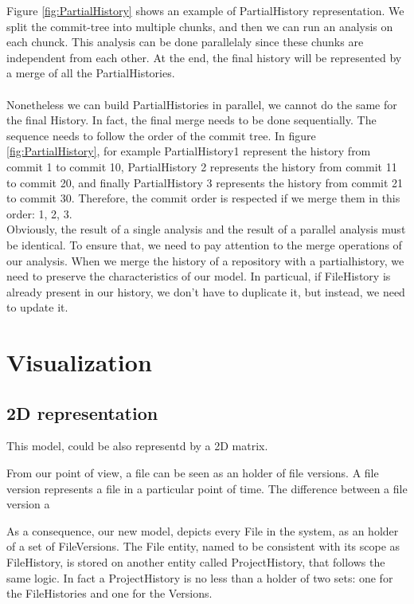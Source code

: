 Figure \ref{fig:PartialHistory} shows an example of PartialHistory representation. 
We split the commit-tree into multiple chunks, and then we can run an analysis on each chunck. 
This analysis can be done parallelaly since these chunks are independent from each other. 
At the end, the final history will be represented by a merge of all the PartialHistories. \\
\\
Nonetheless we can build PartialHistories in parallel, we cannot do the same for the final History. 
In fact, the final merge needs to be done sequentially. The sequence needs to follow the order of the commit tree. 
In figure \ref{fig:PartialHistory}, for example
PartialHistory1 represent the history from commit 1 to commit 10, 
PartialHistory 2 represents the history from commit 11 to commit 20, and finally 
PartialHistory 3 represents the history from commit 21 to commit 30.
Therefore, the commit order is respected if we merge them in this order: 1, 2, 3. 
\\
Obviously, the result of a single analysis and the result of a parallel analysis must be identical. 
To ensure that, we need to pay attention to the merge operations of our analysis.
When we merge the history of a repository with a partialhistory, we need to preserve the characteristics of our model. 
In particual, if FileHistory is already present in our history, we don't have to duplicate it, but instead, we need to update it. 

\section{Visualization}

\subsection*{2D representation}
This model, could be also representd by a 2D matrix. 


From our point of view, a file can be seen as an holder of file versions.
A file version represents a file in a particular point of time. The difference between a file version a


As a consequence, our new model, depicts every File in the system, as an holder of a set of FileVersions. 
The File entity, named to be consistent with its scope as FileHistory, is stored on another entity called ProjectHistory, that follows the same logic. 
In fact a ProjectHistory is no less than a holder of two sets: one for the FileHistories and one for the Versions. 


